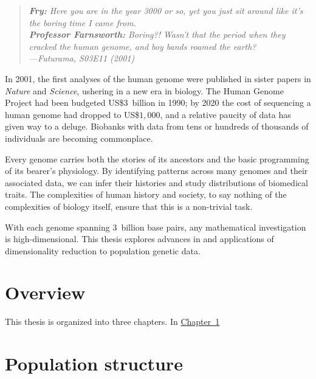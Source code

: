 %
	
\begin{quote} 
\begin{singlespace}
\textit{
\textbf{Fry:} Here you are in the year 3000 or so, yet you just sit around like it's the boring time I came from.\\
\textbf{Professor Farnsworth:} Boring?! Wasn't that the period when they cracked the human genome, and boy bands roamed the earth? \\
---Futurama, S03E11 (2001)}
\end{singlespace}
\end{quote}

In 2001, the first analyses of the human genome were published in sister papers in \textit{Nature} and \textit{Science}, ushering in a new era in biology. The Human Genome Project had been budgeted US\$$3$~billion in 1990; by 2020 the cost of sequencing a human genome had dropped to US\$$1,000$, and a relative paucity of data has given way to a deluge\citep{gibbs_human_2020}. Biobanks with data from tens or hundreds of thousands of individuals are becoming commonplace.

Every genome carries both the stories of its ancestors and the basic programming of its bearer's physiology. By identifying patterns across many genomes and their associated data, we can infer their histories and study distributions of biomedical traits. The complexities of human history and society, to say nothing of the complexities of biology itself, ensure that this is a non-trivial task.

With each genome spanning $3$~billion base pairs, any mathematical investigation is high-dimensional. This thesis explores advances in and applications of dimensionality reduction to population genetic data.

\section{Overview}

This thesis is organized into three chapters. In \hyperref[chap:chapter1]{Chapter~1}


\section{Population structure}

